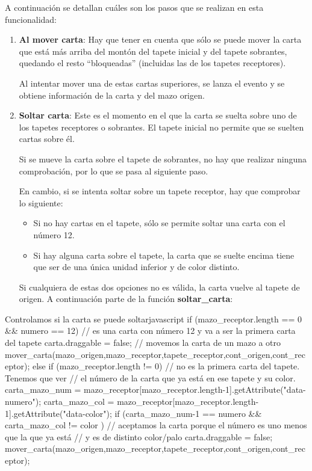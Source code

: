 \documentclass{\ClassPath/viu-tfm-template}
\begin{document}
A continuación se detallan cuáles son los pasos que se realizan en esta funcionalidad:

\vspace{-1em}
\begin{enumerate}
    \item \textbf{Al mover carta}: Hay que tener en cuenta que sólo se puede mover la carta que está más arriba del montón del tapete inicial y del tapete sobrantes, quedando el resto “bloqueadas” (incluidas las de los tapetes receptores).

    Al intentar mover una de estas cartas superiores, se lanza el evento y se obtiene información de la carta y del mazo origen.

    \item \textbf{Soltar carta}: Este es el momento en el que la carta se suelta sobre uno de los tapetes receptores o sobrantes. El tapete inicial no permite que se suelten cartas sobre él.

    Si se mueve la carta sobre el tapete de sobrantes, no hay que realizar ninguna comprobación, por lo que se pasa al siguiente paso.

    En cambio, si se intenta soltar sobre un tapete receptor, hay que comprobar lo siguiente:
        \begin{itemize}
            \item Si no hay cartas en el tapete, sólo se permite soltar una carta con el número 12.
            \item Si hay alguna carta sobre el tapete, la carta que se suelte encima tiene que ser de una única unidad inferior y de color distinto.
        \end{itemize}
    Si cualquiera de estas dos opciones no es válida, la carta vuelve al tapete de origen. A continuación parte de la función \textbf{soltar\_carta}:
\end{enumerate}
\vspace{-0.5em}

\begin{mycode}{Controlamos si la carta se puede soltar}{javascript}{{\footnotesize }}
if (mazo_receptor.length == 0 && numero == 12){
  // es una carta con número 12 y va a ser la primera carta del tapete
  carta.draggable = false;
  // movemos la carta de un mazo a otro
  mover_carta(mazo_origen,mazo_receptor,tapete_receptor,cont_origen,cont_receptor);
} else if (mazo_receptor.length != 0) {
  // no es la primera carta del tapete. Tenemos que ver
  // el número de la carta que ya está en ese tapete y su color.
  carta_mazo_num = mazo_receptor[mazo_receptor.length-1].getAttribute("data-numero");
  carta_mazo_col = mazo_receptor[mazo_receptor.length-1].getAttribute("data-color");
  if (carta_mazo_num-1 == numero && carta_mazo_col != color ) {
    // aceptamos la carta porque el número es uno menos que la que ya está
    // y es de distinto color/palo
    carta.draggable = false;
    mover_carta(mazo_origen,mazo_receptor,tapete_receptor,cont_origen,cont_receptor);
    }
}
\end{mycode}
\end{document}
